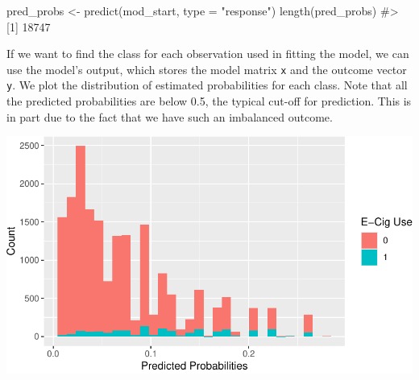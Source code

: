\documentclass[
  letterpaper,
]{latex/krantz}
\makeatletter
\newenvironment{Shaded}{\begin{snugshade}}{\end{snugshade}}
\newcommand{\AttributeTok}[1]{\textcolor[rgb]{0.40,0.45,0.13}{#1}}
\newcommand{\CommentTok}[1]{\textcolor[rgb]{0.37,0.37,0.37}{#1}}
\newcommand{\DecValTok}[1]{\textcolor[rgb]{0.68,0.00,0.00}{#1}}
\newcommand{\FunctionTok}[1]{\textcolor[rgb]{0.28,0.35,0.67}{#1}}
\newcommand{\NormalTok}[1]{\textcolor[rgb]{0.00,0.23,0.31}{#1}}
\newcommand{\OtherTok}[1]{\textcolor[rgb]{0.00,0.23,0.31}{#1}}
\newcommand{\SpecialCharTok}[1]{\textcolor[rgb]{0.37,0.37,0.37}{#1}}
\newcommand{\StringTok}[1]{\textcolor[rgb]{0.13,0.47,0.30}{#1}}
\newenvironment{kframe}{%
\medskip{}
\setlength{\fboxsep}{.8em}
 \def\at@end@of@kframe{}%
 \ifinner\ifhmode%
  \def\at@end@of@kframe{\end{minipage}}%
  \begin{minipage}{\columnwidth}%
 \fi\fi%
 \def\FrameCommand##1{\hskip\@totalleftmargin \hskip-\fboxsep
 \colorbox{shadecolor}{##1}\hskip-\fboxsep
     \hskip-\linewidth \hskip-\@totalleftmargin \hskip\columnwidth}%
 \MakeFramed {\advance\hsize-\width
   \@totalleftmargin\z@ \linewidth\hsize
   \@setminipage}}%
 {\par\unskip\endMakeFramed%
 \at@end@of@kframe}
\renewenvironment{Shaded}{\begin{kframe}}{\end{kframe}}
\makeatother
\begin{document}
\begin{Shaded}
\begin{Highlighting}[]
\NormalTok{pred\_probs }\OtherTok{\textless{}{-}} \FunctionTok{predict}\NormalTok{(mod\_start, }\AttributeTok{type =} \StringTok{"response"}\NormalTok{)}
\FunctionTok{length}\NormalTok{(pred\_probs)}
\CommentTok{\#\textgreater{} [1] 18747}
\end{Highlighting}
\end{Shaded}

If we want to find the class for each observation used in fitting the
model, we can use the model's output, which stores the model matrix
\texttt{x} and the outcome vector \texttt{y}. We plot the distribution
of estimated probabilities for each class. Note that all the predicted
probabilities are below 0.5, the typical cut-off for prediction. This is
in part due to the fact that we have such an imbalanced outcome.

\begin{Shaded}
\end{Shaded}

\begin{center}
\includegraphics[width=1\textwidth,height=\textheight]{book/logistic_regression_files/figure-pdf/unnamed-chunk-9-1.pdf}
\end{center}
\end{document}
